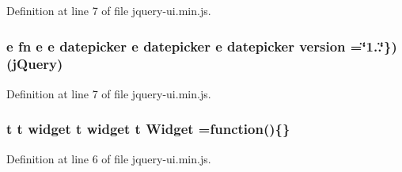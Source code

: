 {{Definition at line 7 of file jquery-\/ui.\+min.\+js.

\subsubsection[{\texorpdfstring{version}{version}}]{ {\bf e} {\bf fn} {\bf e} {\bf e} {\bf datepicker} {\bf e} {\bf datepicker} {\bf e} {\bf datepicker} version =\char`\"{}1..\char`\"{}\})({\bf j\+Query})}\hypertarget{jquery-ui_8min_8js_a48872d9f9d392bdf4af857fe3e0ab638}{}\label{jquery-ui_8min_8js_a48872d9f9d392bdf4af857fe3e0ab638}


Definition at line 7 of file jquery-\/ui.\+min.\+js.

\subsubsection[{\texorpdfstring{Widget}{Widget}}]{ {\bf t} {\bf t} {\bf widget} {\bf t} {\bf widget} {\bf t} Widget =function()\{\}}\hypertarget{jquery-ui_8min_8js_a4f8350df8aecd1a32c74cc9969b37f6c}{}\label{jquery-ui_8min_8js_a4f8350df8aecd1a32c74cc9969b37f6c}


Definition at line 6 of file jquery-\/ui.\+min.\+js.

}}
